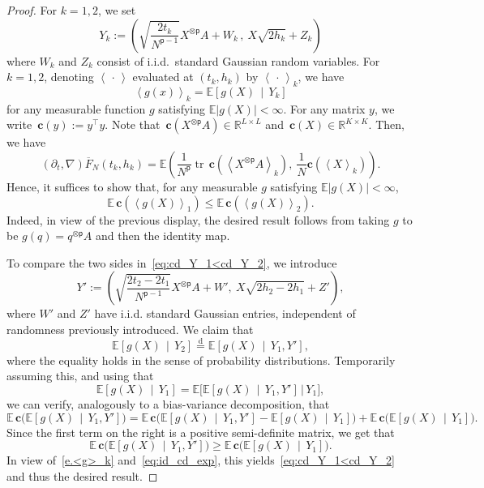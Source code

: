 \documentclass[10pt]{amsart}
\theoremstyle{definition}\newtheorem{defi}[theo]{Definition}\newtheorem{rema}[theo]{Remark}\newtheorem{exam}[theo]{Example}\newtheorem{exem}[theo]{Example}\newtheorem{nota}[theo]{Notation}
\newcommand{\R}{\mathbb{R}}
\newcommand{\E}{\mathbb{E}}
\newcommand{\bfc}{\mathbf{c}}
\DeclareMathOperator{\tr}{tr}
\renewcommand{\d}{\mathrm{d}}
\newcommand{\sfp}{\mathsf{p}}
\renewcommand{\leq}{\leqslant}
\renewcommand{\geq}{\geqslant}
\renewcommand{\bar}{\overline}
\newcommand{\la}{\left\langle}
\newcommand{\ra}{\right\rangle}
\begin{document}
\begin{proof}
For $k =1,2$, we set
\begin{equation*}
Y_k :=\left(\sqrt{\frac{2t_k}{N^{\sfp-1}}}X^{\otimes \sfp}A + W_k \,,\ X\sqrt{2h_k}+Z_k\right)
\end{equation*}
where $W_k$ and $Z_k$ consist of i.i.d.\ standard Gaussian random variables. For $k=1,2$, denoting $\la\,\cdot\,\ra$ evaluated at $(t_k,h_k)$ by $\la \,\cdot\,\ra_{k}$, we have
\begin{equation}\label{e.<g>_k}
\la g(x)\ra_{k} = \E\left[g(X)\,\middle|\,Y_k\right]
\end{equation}
for any measurable function $g$ satisfying $\E|g(X)|<\infty$. For any matrix $y$, we write $\,\bfc(y) := y^\intercal y$. Note that $\,\bfc(X^{\otimes \sfp}A) \in \R^{L\times L}$ and $\,\bfc(X) \in \R^{K\times K}$. Then, we have
\begin{equation*}
\left(\partial_t,\nabla\right)\bar F_N\left(t_k,h_k\right) = \E\left(\frac{1}{N^\sfp} \tr \,\bfc\left(\la X^{\otimes \sfp}A \ra_k\right),\ \frac{1}{N} \bfc\left(\la X\ra_k\right)\right).
\end{equation*}
Hence, it suffices to show that, for any measurable $g$ satisfying $\E|g(X)|<\infty$,
\begin{equation}\label{eq:cd_Y_1<cd_Y_2}
\E \,\bfc\left(\la g(X)\ra_1\right) \leq \E \,\bfc\left(\la g(X)\ra_2\right).
\end{equation}
Indeed, in view of the previous display, the desired result follows from taking $g$ to be $g(q) = q^{\otimes \sfp}A$ and then the identity map.

To compare the two sides in~\eqref{eq:cd_Y_1<cd_Y_2}, we introduce
\[
Y' := \left(\sqrt{\frac{2t_2-2t_1}{N^{\sfp-1}}}X^{\otimes \sfp}A + W',\ X\sqrt{2h_2-2h_1}+Z'\right),
\]
where $W'$ and $Z'$ have i.i.d. standard Gaussian entries, {independent of randomness previously introduced}. We claim that
\begin{equation}\label{eq:id_cd_exp}
\E\left[g(X)\,\middle|\,Y_2\right] \stackrel{\d}{=} \E\left[g(X)\,\middle|\,Y_1, Y'\right],
\end{equation}
where the equality holds in the sense of probability distributions. Temporarily assuming this, and using that
\[
\E\left[g(X)\,\middle|\, Y_1\right] = \E\big[\E \left[g(X)\,\middle|\, Y_1,Y'\right]\,\big|\,Y_1\big],
\]
we can verify, analogously to a bias-variance decomposition, that
\[
\E \,\bfc\big(\E\left[g(X)\,\middle|\, Y_1,Y'\right]\big) = \E \,\bfc\big(\E\left[g(X)\,\middle|\, Y_1,Y'\right]-\E\left[g(X)\,\middle|\, Y_1\right]\big)+\E \,\bfc\big(\E\left[g(X)\,\middle|\, Y_1\right]\big).
\]
Since the first term on the right is a positive semi-definite matrix, we get that
\[
\E \,\bfc\big(\E\left[g(X)\,\middle|\, Y_1,Y'\right]\big) \geq\E \,\bfc\big(\E\left[g(X)\,\middle|\, Y_1\right]\big).
\]
In view of~\eqref{e.<g>_k} and~\eqref{eq:id_cd_exp}, this yields~\eqref{eq:cd_Y_1<cd_Y_2} and thus the desired result.


\end{proof}
\end{document}

